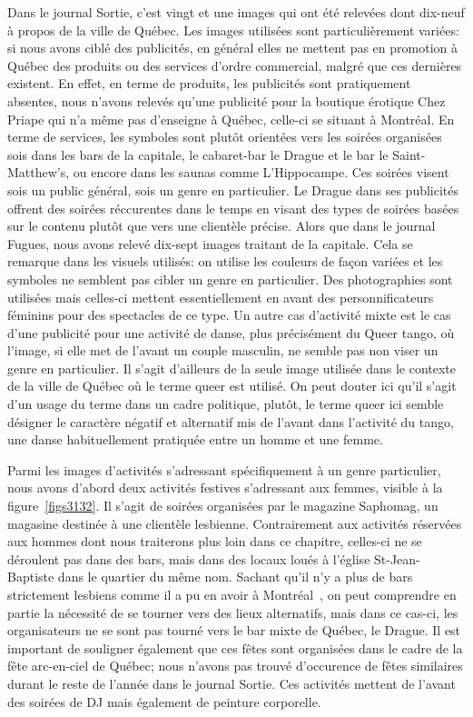 Dans le journal Sortie, c'est vingt et une images qui ont été relevées dont dix-neuf à propos de la ville de Québec. 
Les images utilisées sont particulièrement variées: si nous avons ciblé des publicités, en général elles ne mettent pas en promotion à Québec des produits ou des services d'ordre commercial, malgré que ces dernières existent. 
En effet, en terme de produits, les publicités sont pratiquement absentes, nous n'avons relevés qu'une publicité pour la boutique érotique Chez Priape qui n'a même pas d'enseigne à Québec, celle-ci se situant à Montréal. 
En terme de services, les symboles sont plutôt orientées vers les soirées organisées sois dans les bars de la capitale, le cabaret-bar le Drague et le bar le Saint-Matthew's, ou encore dans les saunas comme L'Hippocampe. 
Ces soirées visent sois un public général, sois un genre en particulier. 
Le Drague dans ses publicités offrent des soirées réccurentes dans le temps en visant des types de soirées basées sur le contenu plutôt que vers une clientèle précise. 
Alors que dans le journal Fugues, nous avons relevé dix-sept images traitant de la capitale. 
Cela se remarque dans les visuels utilisés: on utilise les couleurs de façon variées et les symboles ne semblent pas cibler un genre en particulier. 
Des photographies sont utilisées mais celles-ci mettent essentiellement en avant des personnificateurs féminins pour des spectacles de ce type. 
Un autre cas d'activité mixte est le cas d'une publicité pour une activité de danse, plus précisément du Queer tango, où l'image, si elle met de l'avant un couple masculin, ne semble pas non viser un genre en particulier. 
Il s'agit d'ailleurs de la seule image utilisée dans le contexte de la ville de Québec où le terme queer est utilisé. 
On peut douter ici qu'il s'agit d'un usage du terme dans un cadre politique, plutôt, le terme queer ici semble désigner le caractère négatif et alternatif mis de l'avant dans l'activité du tango, une danse habituellement pratiquée entre un homme et une femme.

Parmi les images d'activités s'adressant spécifiquement à un genre particulier, nous avons d'abord deux activités festives s'adressant aux femmes, visible à la figure~\ref{figs3132}. 
Il s'agit de soirées organisées par le magazine Saphomag, un magasine destinée à une clientèle lesbienne. 
Contrairement aux activités réservées aux hommes dont nous traiterons plus loin dans ce chapitre, celles-ci ne se déroulent pas dans des bars, mais dans des locaux loués à l'église St-Jean-Baptiste dans le quartier du même nom. 
Sachant qu'il n'y a plus de bars strictement lesbiens comme il a pu en avoir à Montréal~\citep{Podmore2006}, on peut comprendre en partie la nécessité de se tourner vers des lieux alternatifs, mais dans ce cas-ci, les organisateurs ne se sont pas tourné vers le bar mixte de Québec, le Drague. 
Il est important de souligner également que ces fêtes sont organisées dans le cadre de la fête arc-en-ciel de Québec; nous n'avons pas trouvé d'occurence de fêtes similaires durant le reste de l'année dans le journal Sortie. 
Ces activités mettent de l'avant des soirées de DJ mais également de peinture corporelle.


